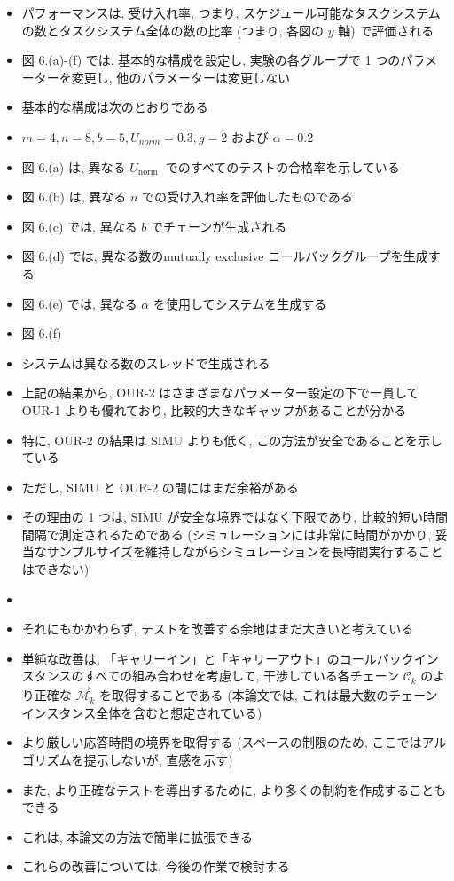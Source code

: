 \begin{frame}{}
    \begin{itemize}
        \item パフォーマンスは, 受け入れ率, つまり, スケジュール可能なタスクシステムの数とタスクシステム全体の数の比率 (つまり, 各図の $y$ 軸) で評価される
\item 図 6.(a)-(f) では, 基本的な構成を設定し, 実験の各グループで 1 つのパラメーターを変更し, 他のパラメーターは変更しない
\item 基本的な構成は次のとおりである
\item $m=4, n=8, b=5, U_{n o r m}=0.3, g=2$ および $\alpha=0.2$ 
\item 図 6.(a) は, 異なる $U_{\text {norm }}$ でのすべてのテストの合格率を示している
\item 図 6.(b) は, 異なる $n$ での受け入れ率を評価したものである
\item 図 6.(c) では, 異なる $b$ でチェーンが生成される
\item 図 6.(d) では, 異なる数のmutually exclusive コールバックグループを生成する
\item 図 6.(e) では, 異なる $\alpha$ を使用してシステムを生成する
\item 図 6.(f)
\item システムは異なる数のスレッドで生成される
    \end{itemize}
\end{frame}


\begin{frame}{}
    \begin{itemize}
        \item 上記の結果から, OUR-2 はさまざまなパラメーター設定の下で一貫して OUR-1 よりも優れており, 比較的大きなギャップがあることが分かる
\item 特に, OUR-2 の結果は SIMU よりも低く, この方法が安全であることを示している
\item ただし, SIMU と OUR-2 の間にはまだ余裕がある
\item その理由の 1 つは, SIMU が安全な境界ではなく下限であり, 比較的短い時間間隔で測定されるためである (シミュレーションには非常に時間がかかり, 妥当なサンプルサイズを維持しながらシミュレーションを長時間実行することはできない)
\item
\item それにもかかわらず, テストを改善する余地はまだ大きいと考えている
\item 単純な改善は, 「キャリーイン」と「キャリーアウト」のコールバックインスタンスのすべての組み合わせを考慮して, 干渉している各チェーン $\mathcal{C}_{k}$ のより正確な $\overrightarrow{\mathcal{M}}_{k}$ を取得することである (本論文では, これは最大数のチェーンインスタンス全体を含むと想定されている)
\item より厳しい応答時間の境界を取得する (スペースの制限のため, ここではアルゴリズムを提示しないが, 直感を示す)
\item また, より正確なテストを導出するために, より多くの制約を作成することもできる
\item これは, 本論文の方法で簡単に拡張できる
\item これらの改善については, 今後の作業で検討する
    \end{itemize}
\end{frame}



